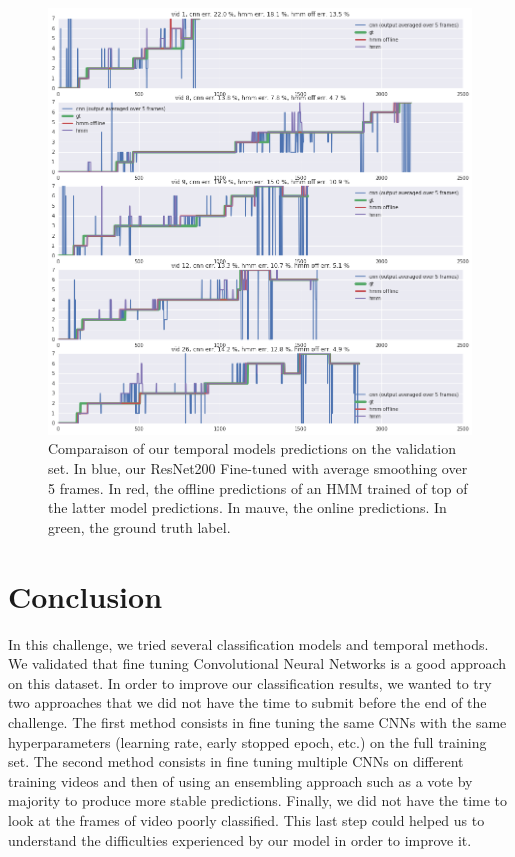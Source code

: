\documentclass[10pt,twocolumn,letterpaper]{article}
\begin{document}
\begin{figure}
\begin{center}
   \includegraphics[width=1\linewidth]{images/visu.png}
\end{center}
   \caption{Comparaison of our temporal models predictions on the validation set. In blue, our ResNet200 Fine-tuned with average smoothing over 5 frames. In red, the offline predictions of an HMM trained of top of the latter model predictions. In mauve, the online predictions. In green, the ground truth label. }
\label{fig:long}
\label{fig:onecol}
\end{figure}



\section{Conclusion}

In this challenge, we tried several classification models and temporal methods. We validated that fine tuning Convolutional Neural Networks is a good approach on this dataset. In order to improve our classification results, we wanted to try two approaches that we did not have the time to submit before the end of the challenge. The first method consists in fine tuning the same CNNs with the same hyperparameters (learning rate, early stopped epoch, etc.) on the full training set. The second method consists in fine tuning multiple CNNs on different training videos and then of using an ensembling approach such as a vote by majority to produce more stable predictions. Finally, we did not have the time to look at the frames of video poorly classified. This last step could helped us to understand the difficulties experienced by our model in order to improve it.







{\small


}
\end{document}
